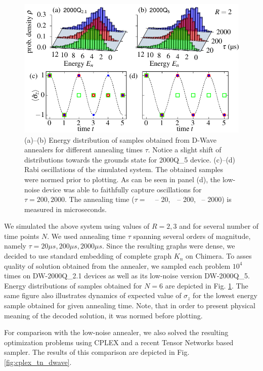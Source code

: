\begin{figure}[!h]
    \centering
    \includegraphics{figures/fig2.pdf}
    \caption{(a)--(b) Energy distribution of samples obtained from D-Wave annealers for different annealing times $\tau$. Notice a slight shift of distributions towards the grounds state for 2000Q\_{5} device. (c)--(d) Rabi oscillations of the simulated system. The obtained samples were normed prior to plotting. As can be seen in panel (d), the low-noise device was able to faithfully capture oscillations for $\tau=200, 2000$.
    The annealing time ($\tau=$
    \tikzquad\,\,\, -- 20,
    \,\tikzcircle\,\,\,-- 200,
    \,\tikzdot\,\,-- 2000)
      is measured in microseconds.
    }
    \label{fig:energy-hist}
\end{figure}
We simulated the above system using values of $R=2, 3$ and for several number of time points $N$. We used annealing time $\tau$ spanning several orders of magnitude, namely $\tau=20\mu s, 200 \mu s, 2000 \mu s$. Since the resulting graphs were dense, we decided to use standard embedding of complete graph $K_n$ on Chimera. To asses quality of solution obtained from the annealer, we sampled each problem $10^4$ times on  DW-2000Q\_{2.1} devices as well as its low-noise version DW-2000Q\_{5}. Energy distributions of samples obtained for $N=6$ are depicted in Fig. \ref{fig:energy-hist}. The same figure also illustrates dynamics of expected value of $\sigma_z$ for the lowest energy sample obtained for given annealing time. Note, that in order to present physical meaning of the decoded solution, it was normed before plotting.

For comparison with the low-noise annealer, we also solved the resulting optimization problems using CPLEX and a recent Tensor Networks based sampler. The results of this comparison are depicted in Fig. \ref{fig:cplex_tn_dwave}.


